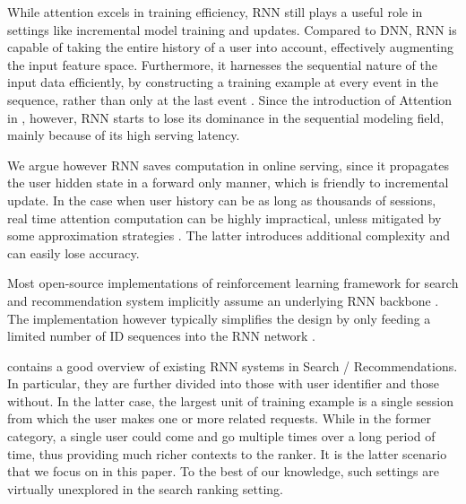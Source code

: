 While attention excels in training efficiency, RNN still plays a useful role in settings like incremental model training and updates. 
Compared to DNN, RNN is capable of taking the entire history of a user into account, effectively augmenting the input feature space. Furthermore, it harnesses the sequential nature of the input data efficiently, by constructing a training example at every event in the sequence, rather than only at the last event \cite{zhang2014sequential}. Since the introduction of Attention in \cite{vaswani2017attention}, however, RNN starts to lose its dominance in the sequential modeling field, mainly because of its high serving latency. 

We argue however RNN saves computation in online serving, since it propagates the user hidden state in a forward only manner, which is friendly to incremental update. In the case when user history can be as long as thousands of sessions, real time attention computation can be highly impractical, unless mitigated by some approximation strategies \cite{drachsler2008personal}. The latter introduces additional complexity and can easily lose accuracy. 

Most open-source implementations of reinforcement learning framework for search and recommendation system implicitly assume an underlying RNN backbone \cite{chen2019top}. The implementation however typically simplifies the design by only feeding a limited number of ID sequences into the RNN network \cite{zhao2019deep}. 

\cite{zhang2019deep} contains a good overview of existing RNN systems in Search / Recommendations. In particular, they are further divided into those with user identifier and those without. In the latter case, the largest unit of training example is a single session from which the user makes one or more related requests. While in the former category, a single user could come and go multiple times over a long period of time, thus providing much richer contexts to the ranker. It is the latter scenario that we focus on in this paper. To the best of our knowledge, such settings are virtually unexplored in the search ranking setting.





